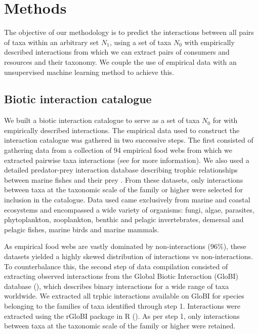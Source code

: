 \documentclass[letterpaper]{article}
\begin{document}
\section{Methods}
The objective of our methodology is to predict the interactions between all pairs of taxa within an arbitrary set $N_1$, using a set of taxa $N_0$ with empirically described interactions from which we can extract pairs of consumers and resources and their taxonomy. We couple the use of empirical data with an unsupervised machine learning method to achieve this.

 \subsection{Biotic interaction catalogue}
We built a biotic interaction catalogue to serve as a set of taxa $N_0$ for with empirically described interactions. The empirical data used to construct the interaction catalogue was gathered in two successive steps. The first consisted of gathering data from a collection of 94 empirical food webs from which we extracted pairwise taxa interactions (see \cite{Brose2005, Kortsch2015, UniversityofCanberra2016} for more information). We also used a detailed predator-prey interaction database describing trophic relationships between marine fishes and their prey \citep{Barnes2008}. From these datasets, only interactions between taxa at the taxonomic scale of the family or higher were selected for inclusion in the catalogue. Data used came exclusively from marine and coastal ecosystems and encompassed a wide variety of organisms: fungi, algae, parasites, phytoplankton, zooplankton, benthic and pelagic invertebrates, demersal and pelagic fishes, marine birds and marine mammals.

As empirical food webs are vastly dominated by non-interactions (96\%), these datasets yielded a highly skewed distribution of interactions vs non-interactions. To counterbalance this, the second step of data compilation consisted of extracting observed interactions from the Global Biotic Interaction (GloBI) database (\cite{Poelen2014}), which describes binary interactions for a wide range of taxa worldwide. We extracted all trphic interactions available on GloBI for species belonging to the families of taxa identified through step 1. Interactions were extracted using the rGloBI package in R (\cite{Poelen2015}). As per step 1, only interactions between taxa at the taxonomic scale of the family or higher were retained.
\end{document}
